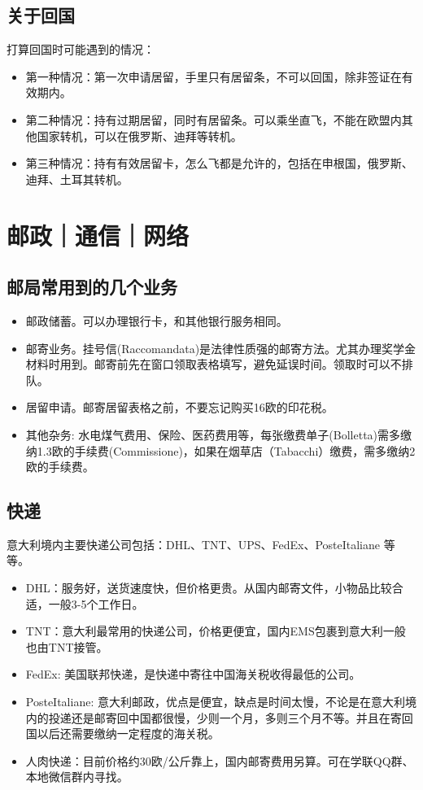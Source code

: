 \subsection{关于回国}
打算回国时可能遇到的情况：
\begin{itemize}
\item 第一种情况：第一次申请居留，手里只有居留条，不可以回国，除非签证在有效期内。
\item 第二种情况：持有过期居留，同时有居留条。可以乘坐直飞，不能在欧盟内其他国家转机，可以在俄罗斯、迪拜等转机。
\item 第三种情况：持有有效居留卡，怎么飞都是允许的，包括在申根国，俄罗斯、迪拜、土耳其转机。
\end{itemize}

\section{邮政｜通信｜网络}

\subsection{邮局常用到的几个业务}
\begin{itemize}
\item 邮政储蓄。可以办理银行卡，和其他银行服务相同。
\item 邮寄业务。挂号信(Raccomandata)是法律性质强的邮寄方法。尤其办理奖学金材料时用到。邮寄前先在窗口领取表格填写，避免延误时间。领取时可以不排队。
\item 居留申请。邮寄居留表格之前，不要忘记购买16欧的印花税。
\item 其他杂务: 水电煤气费用、保险、医药费用等，每张缴费单子(Bolletta)需多缴纳1.3欧的手续费(Commissione)，如果在烟草店（Tabacchi）缴费，需多缴纳2欧的手续费。

\end{itemize}

\subsection{快递}
意大利境内主要快递公司包括：DHL、TNT、UPS、FedEx、PosteItaliane 等等。
\begin{itemize}
\item DHL：服务好，送货速度快，但价格更贵。从国内邮寄文件，小物品比较合适，一般3-5个工作日。
\item TNT：意大利最常用的快递公司，价格更便宜，国内EMS包裹到意大利一般也由TNT接管。
\item FedEx: 美国联邦快递，是快递中寄往中国海关税收得最低的公司。
\item PosteItaliane: 意大利邮政，优点是便宜，缺点是时间太慢，不论是在意大利境内的投递还是邮寄回中国都很慢，少则一个月，多则三个月不等。并且在寄回国以后还需要缴纳一定程度的海关税。
\item 人肉快递：目前价格约30欧/公斤靠上，国内邮寄费用另算。可在学联QQ群、本地微信群内寻找。
\end{itemize}

